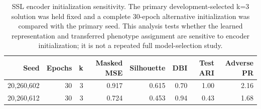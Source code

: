 \begin{table}[H]
\centering
\caption{SSL encoder initialization sensitivity. The primary development-selected k=3 solution was held fixed and a complete 30-epoch alternative initialization was compared with the primary seed. This analysis tests whether the learned representation and transferred phenotype assignment are sensitive to encoder initialization; it is not a repeated full model-selection study.}
\label{tab:seed_sensitivity}
\scriptsize
\setlength{\tabcolsep}{4pt}
\begin{tabular*}{\textwidth}{@{\extracolsep{\fill}}rrrrrrrr@{}}
\toprule
Seed & Epochs & k & Masked MSE & Silhouette & DBI & Test ARI & Adverse PR \\
\midrule
20,260,602 & 30 & 3 & 0.917 & 0.615 & 0.70 & 1.00 & 2.16 \\
20,260,612 & 30 & 3 & 0.724 & 0.453 & 0.94 & 0.43 & 1.68 \\
\bottomrule
\end{tabular*}
\end{table}
